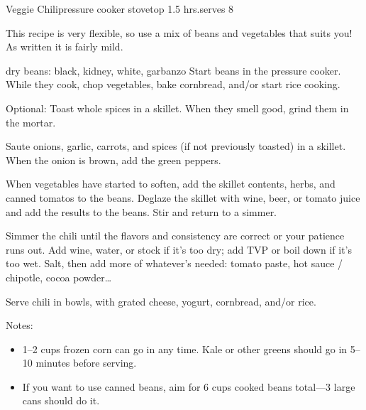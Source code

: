\begin{recipe}{Veggie Chili}{pressure cooker \hfill stovetop \hfill 1.5 hrs.}{serves 8}

 \freeform This recipe is very flexible, so use a mix of beans and vegetables that suits you! As written it is fairly mild.

  {dry beans: black, kidney, white, garbanzo}
 Start beans in the pressure cooker. While they cook, chop vegetables, bake cornbread, and/or start rice cooking.

 Optional: Toast whole spices in a skillet. When they smell good, grind them in the mortar.

 Saute onions, garlic, carrots, and spices (if not previously toasted) in a skillet. When the onion is brown, add the green peppers.

 When vegetables have started to soften, add the skillet contents, herbs, and canned tomatos to the beans. Deglaze the skillet with wine, beer, or tomato juice and add the results to the beans. Stir and return to a simmer.

 \newstep Simmer the chili until the flavors and consistency are correct or your patience runs out. Add wine, water, or stock if it's too dry; add TVP or boil down if it's too wet. Salt, then add more of whatever's needed: tomato paste, hot sauce / chipotle, cocoa powder\dots

 \newstep Serve chili in bowls, with grated cheese, yogurt, cornbread, and/or rice.

 \freeform Notes:
 \begin{itemize}
  \item 1--2 cups frozen corn can go in any time. Kale or other greens should go in 5--10 minutes before serving.
  \item If you want to use canned beans, aim for 6 cups cooked beans total---3 large cans should do it.
 \end{itemize}
\end{recipe}
